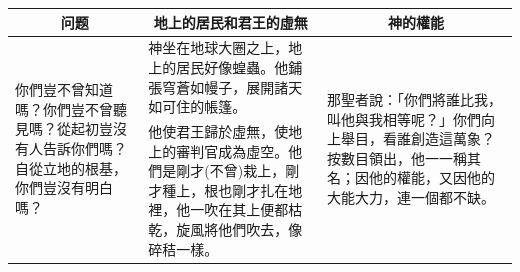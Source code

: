 \begin{table}[H]
\hspace{-6mm}
\centering
\begin{tabular}{p{3.25cm}|p{8.25cm}|p{4.85cm}}\hline\hline
\multicolumn{1}{c|}{问题}&\multicolumn{1}{c}{地上的居民和君王的虛無}&\multicolumn{1}{c}{神的權能}\\\hline\hline
\multirow{2}{3.5cm}{你們豈不曾知道嗎？你們豈不曾聽見嗎？從起初豈沒有人告訴你們嗎？自從立地的根基，你們豈沒有明白嗎？}
&神坐在地球大圈之上，地上的居民好像蝗蟲。他鋪張穹蒼如幔子，展開諸天如可住的帳篷。
&\multirow{2}{5cm}{那聖者說：「你們將誰比我，叫他與我相等呢？」你們向上舉目，看誰創造這萬象？按數目領出，他一一稱其名；因他的權能，又因他的大能大力，連一個都不缺。}\\\cline{2-2}
&他使君王歸於虛無，使地上的審判官成為虛空。他們是剛才(不曾)栽上，剛才種上，根也剛才扎在地裡，他一吹在其上便都枯乾，旋風將他們吹去，像碎秸一樣。
&\\\hline
\end{tabular}
\end{table}


